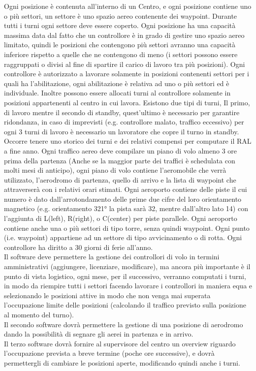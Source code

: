 Ogni posizione è contenuta all'interno di un Centro, e ogni posizione contiene uno o più settori, un settore è uno spazio aereo contenente dei waypoint. Durante tutti i turni ogni settore deve essere coperto. 
Ogni posizione ha una capacità massima data dal fatto che un controllore è in grado di gestire uno spazio aereo limitato, quindi le posizioni che contengono più settori avranno una capacità inferiore rispetto a quelle che ne contengono di meno (i settori possono essere raggruppati o divisi al fine di spartire il carico di lavoro tra più posizioni).
Ogni controllore è autorizzato a lavorare solamente in posizioni contenenti settori per i quali ha l’abilitazione, ogni abilitazione è relativa ad uno o più settori ed è individuale. Inoltre possono essere allocati turni al controllore solamente in posizioni appartenenti al centro in cui lavora.
Esistono due tipi di turni, Il primo, di lavoro mentre il secondo di standby, quest'ultimo è necessario per garantire ridondanza, in caso di imprevisti (e.g. controllore malato, traffico eccessivo)
per ogni 3 turni di lavoro è necessario un lavoratore che copre il turno in standby. Occorre tenere uno storico dei turni e dei relativi compensi per computare il RAL a fine anno.
Ogni traffico aereo deve compilare un piano di volo almeno 3 ore prima della partenza (Anche se la maggior parte dei traffici è schedulata con molti mesi di anticipo), ogni piano di volo contiene l'aeromobile che verrà utilizzato, l'aerodromo di partenza, quello di arrivo e la lista di waypoint che attraverserà con i relativi orari stimati. Ogni aeroporto contiene delle piste il cui numero è dato dall'arrotondamento delle prime due cifre del loro orientamento magnetico (e.g. orientamento 321° la pista sarà 32, mentre dall'altro lato 14) con l'aggiunta di L(left), R(right), o C(center) per piste parallele. Ogni aeroporto contiene anche una o più settori di tipo torre, senza quindi waypoint. 
Ogni punto (i.e. waypoint) appartiene ad un settore di tipo avvicinamento o di rotta.
Ogni controllore ha diritto a 30 giorni di ferie all'anno.\\
Il software deve permettere la gestione dei controllori di volo in termini amministrativi (aggiungere, licenziare, modificare), 
ma ancora più importante è il punto di vista logistico, ogni mese, per il successivo, verranno computati i turni, in modo da riempire tutti i settori facendo lavorare i controllori in maniera equa e selezionando le posizioni attive in modo che non venga mai superata l'occupazione limite delle posizioni (calcolando il traffico previsto sulla posizione al momento del turno).\\
Il secondo software dovrà permettere la gestione di una posizione di aerodromo dando la possibilità di segnare gli aerei in partenza e in arrivo.\\
Il terzo software dovrà fornire al supervisore del centro un overview riguardo l'occupazione prevista a breve termine (poche ore successive), e dovrà permettergli di cambiare le posizioni aperte, modificando quindi anche i turni.\\
